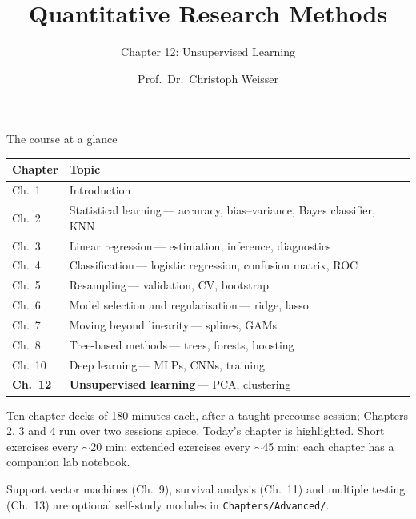 \documentclass[aspectratio=169,11pt]{beamer}
\title{Quantitative Research Methods}
\subtitle{Chapter 12: Unsupervised Learning}
\author{Prof.\ Dr.\ Christoph Weisser}
\date{}\graphicspath{{images/}}
\begin{document}
\begin{frame}[plain]\titlepage\end{frame}

\begin{frame}{The course at a glance}
  \vspace{-1.5mm}
  \begin{center}
  \scriptsize
  \setlength{\tabcolsep}{5pt}
  \renewcommand{\arraystretch}{1.30}
  \begin{tabular}{@{\hspace{2pt}}l >{\raggedright\arraybackslash}p{}@{\hspace{2pt}}}
    \toprule
    \textbf{Chapter} & \textbf{Topic} \\
    \midrule
     {\color{accent}Ch.\ 1} & Introduction \\
    \rowcolor{black!3} {\color{accent}Ch.\ 2} & Statistical learning\,{\color{black!45}--- accuracy, bias--variance, Bayes classifier, KNN} \\
     {\color{accent}Ch.\ 3} & Linear regression\,{\color{black!45}--- estimation, inference, diagnostics} \\
    \rowcolor{black!3} {\color{accent}Ch.\ 4} & Classification\,{\color{black!45}--- logistic regression, confusion matrix, ROC} \\
     {\color{accent}Ch.\ 5} & Resampling\,{\color{black!45}--- validation, CV, bootstrap} \\
    \rowcolor{black!3} {\color{accent}Ch.\ 6} & Model selection and regularisation\,{\color{black!45}--- ridge, lasso} \\
     {\color{accent}Ch.\ 7} & Moving beyond linearity\,{\color{black!45}--- splines, GAMs} \\
    \rowcolor{black!3} {\color{accent}Ch.\ 8} & Tree-based methods\,{\color{black!45}--- trees, forests, boosting} \\
     {\color{accent}Ch.\ 10} & Deep learning\,{\color{black!45}--- MLPs, CNNs, training} \\
    \rowcolor{accent!18} \textbf{Ch.\ 12} & \textbf{Unsupervised learning}\,{\color{accent!75!black}--- PCA, clustering} \\
    \bottomrule
  \end{tabular}
  \end{center}
  \vspace{1mm}
  {\scriptsize Ten chapter decks of 180 minutes each, after a taught precourse session; Chapters 2, 3 and 4 run over two sessions apiece. Today's chapter is highlighted. Short exercises every $\sim$20 min; extended exercises every $\sim$45 min; each chapter has a companion lab notebook.\par\medskip Support vector machines (Ch.\ 9), survival analysis (Ch.\ 11) and multiple testing (Ch.\ 13) are optional self-study modules in \texttt{Chapters/Advanced/}.}
\end{frame}
\end{document}

